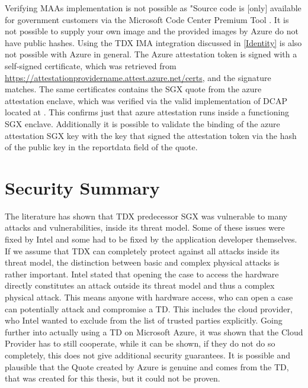 Verifying MAAs implementation is not possible as \guillemotright"Source code is [only] available for government customers via the Microsoft Code Center Premium Tool \guillemotleft \cite{dan_mabee_azure_attestation_2023}. It is not possible to supply your own image and the provided images by Azure do not have public hashes. Using the TDX IMA integration discussed in \ref{Identity} is also not possible with Azure in general.
The Azure attestation token is signed with a self-signed certificate, which was retrieved from \url{https://attestationprovidername.attest.azure.net/certs}, and the signature matches. The same certificates contains the \Gls{SGX} quote from the azure attestation enclave, which was verified via the valid implementation of DCAP located at \cite{microsoft_corporation_azure-samplesmicrosoft-azure-attestation_nodate}. This confirms just that azure attestation runs inside a functioning \Gls{SGX} enclave. Additionally it is possible to validate the binding of the azure attestation \Gls{SGX} key with the key that signed the attestation token via the hash of the public key in the reportdata field of the quote.

\section{Security Summary}

The literature has shown that TDX predecessor \Gls{SGX} was vulnerable to many attacks and vulnerabilities, inside its threat model. Some of these issues were fixed by Intel and some had to be fixed by the application developer themselves. If we assume that TDX can completely protect against all attacks inside its threat model, the distinction between basic and complex physical attacks is rather important. Intel stated that opening the case to access the hardware directly constitutes an attack outside its threat model and thus a complex physical attack. This means anyone with hardware access, who can open a case can potentially attack and compromise a TD. This includes the cloud provider, who Intel wanted to exclude from the list of trusted parties explicitly.
Going further into actually using a TD on Microsoft Azure, it was shown that the Cloud Provider has to still cooperate, while it can be shown, if they do not do so completely, this does not give additional security guarantees. It is possible and plausible that the Quote created by Azure is genuine and comes from the TD, that was created for this thesis, but it could not be proven.

